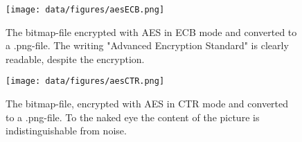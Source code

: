 \begin{figure}[h]
\centering
\texttt{[image: data/figures/aesECB.png]}
\caption{The bitmap-file encrypted with AES in \ac{ECB} mode and converted to a .png-file. The writing "Advanced Encryption Standard" is clearly readable, despite the encryption.}
\label{fig:aesecbpng}
\end{figure}

\begin{figure}[h]
\centering
\texttt{[image: data/figures/aesCTR.png]}
\caption{The bitmap-file, encrypted with AES in CTR mode and converted to a .png-file. To the naked eye the content of the picture is indistinguishable from noise.}
\label{fig:aesctrpng}
\end{figure}


\begin{table}[h]
\end{table}
